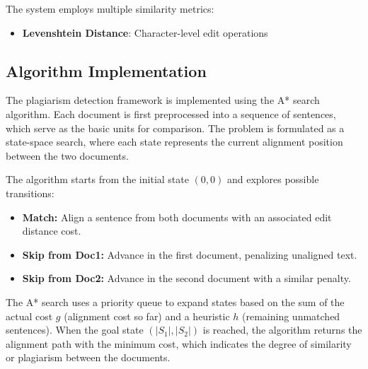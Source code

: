 \documentclass[conference]{IEEEtran}
\begin{document}
The system employs multiple similarity metrics:
\begin{itemize}
\item \textbf{Levenshtein Distance}: Character-level edit operations
\end{itemize}

\subsection{Algorithm Implementation}
The plagiarism detection framework is implemented using the A* search algorithm. 
Each document is first preprocessed into a sequence of sentences, which serve as 
the basic units for comparison. The problem is formulated as a state-space search, 
where each state represents the current alignment position between the two documents.  

The algorithm starts from the initial state $(0,0)$ and explores possible transitions:  
\begin{itemize}
    \item \textbf{Match:} Align a sentence from both documents with an associated edit distance cost.  
    \item \textbf{Skip from Doc1:} Advance in the first document, penalizing unaligned text.  
    \item \textbf{Skip from Doc2:} Advance in the second document with a similar penalty.  
\end{itemize}

The A* search uses a priority queue to expand states based on the sum of the actual cost 
$g$ (alignment cost so far) and a heuristic $h$ (remaining unmatched sentences).  
When the goal state $(|S_1|, |S_2|)$ is reached, the algorithm returns the alignment path 
with the minimum cost, which indicates the degree of similarity or plagiarism between the documents.
\end{document}
